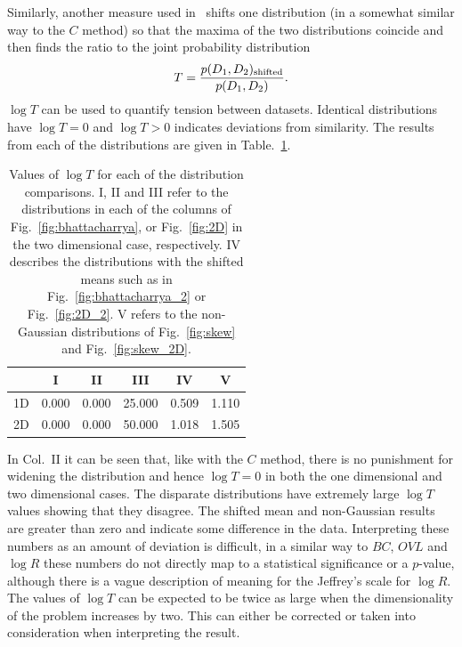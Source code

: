 \documentclass[twocolumn]{revtex4-1}
\begin{document}
    \\
    \\
    Similarly, another measure used in~\cite{Verde:2013wza} shifts one distribution (in a somewhat similar way to the $C$ method) so that the maxima of the two distributions coincide and then finds the ratio to the joint probability distribution
    \begin{equation}
        T = \frac{p(D_1,D_2)_{\rm shifted}}{p(D_1,D_2)}.
    \end{equation}
    $\log T$ can be used to quantify tension between datasets.
    Identical distributions have $\log T=0$ and $\log T>0$ indicates deviations from similarity.
    The results from each of the distributions are given in Table.~\ref{tab:T}.
        \begin{table}
        \centering
        \begin{tabular}{l|ccccc}
              & I & II & III & IV & V \\ \hline\hline
           1D & 0.000 & 0.000 & 25.000 & 0.509 & 1.110 \\
           2D & 0.000 & 0.000 & 50.000 & 1.018 & 1.505
        \end{tabular}
        \caption{Values of $\log T$ for each of the distribution comparisons. I, II and III refer to the distributions in each of the columns of Fig.~\ref{fig:bhattacharrya}, or Fig.~\ref{fig:2D} in the two dimensional case, respectively. IV describes the distributions with the shifted means such as in Fig.~\ref{fig:bhattacharrya_2} or Fig.~\ref{fig:2D_2}. V refers to the non-Gaussian distributions of Fig.~\ref{fig:skew} and Fig.~\ref{fig:skew_2D}.}
        \label{tab:T}
    \end{table}
    \noindent In Col.~II it can be seen that, like with the $C$ method, there is no punishment for widening the distribution and hence $\log T=0$ in both the one dimensional and two dimensional cases. 
    The disparate distributions have extremely large $\log T$ values showing that they disagree.
    The shifted mean and non-Gaussian results are greater than zero and indicate some difference in the data.
    Interpreting these numbers as an amount of deviation is difficult, in a similar way to $BC$, $OVL$ and $\log R$ these numbers do not directly map to a statistical significance or a $p$-value, although there is a vague description of meaning for the Jeffrey's scale for $\log R$.
    The values of $\log T$ can be expected to be twice as large when the dimensionality of the problem increases by two.
    This can either be corrected or taken into consideration when interpreting the result.
\end{document}
